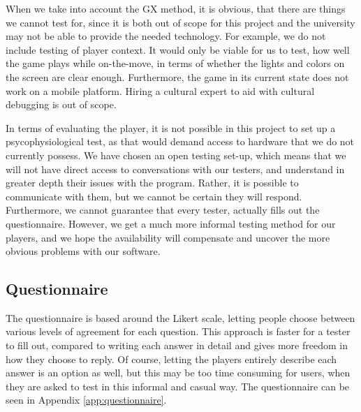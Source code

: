 When we take into account the GX method, it is obvious, that there are things we cannot test for, since it is both out of scope for this project and the university may not be able to provide the needed technology.
For example, we do not include testing of player context.
It would only be viable for us to test, how well the game plays while on-the-move, in terms of whether the lights and colors on the screen are clear enough. Furthermore, the game in its current state does not work on a mobile platform.
Hiring a cultural expert to aid with cultural debugging is out of scope.


In terms of evaluating the player, it is not possible in this project to set up a psycophysiological test, as that would demand access to hardware that we do not currently possess. We have chosen an open testing set-up, which means that we will not have direct access to conversations with our testers, and understand in greater depth their issues with the program. Rather, it is possible to communicate with them, but we cannot be certain they will respond. Furthermore, we cannot guarantee that every tester, actually fills out the questionnaire. However, we get a much more informal testing method for our players, and we hope the availability will compensate and uncover the more obvious problems with our software.

\subsection{Questionnaire}

The questionnaire is based around the Likert scale, letting people choose between various levels of agreement for each question. This approach is faster for a tester to fill out, compared to writing each answer in detail and gives more freedom in how they choose to reply. Of course, letting the players entirely describe each answer is an option as well, but this may be too time consuming for users, when they are asked to test in this informal and casual way. The questionnaire can be seen in Appendix \ref{app:questionnaire}.